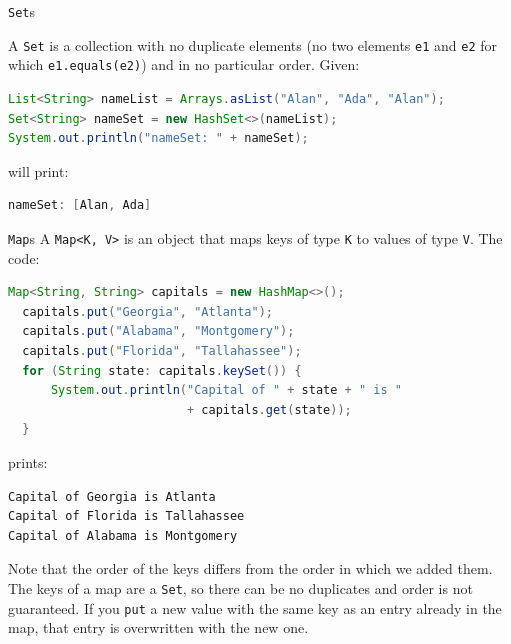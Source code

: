 \documentclass{beamer}
\begin{document}
\begin{frame}[fragile]{{\tt Set}s}

A {\tt Set} is a collection with no duplicate elements (no two elements {\tt e1} and {\tt e2} for which {\tt e1.equals(e2)}) and in no particular order.  Given:
\begin{lstlisting}[language=Java]
List<String> nameList = Arrays.asList("Alan", "Ada", "Alan");
Set<String> nameSet = new HashSet<>(nameList);
System.out.println("nameSet: " + nameSet);
\end{lstlisting}
will print:
\begin{lstlisting}[language=Java]
nameSet: [Alan, Ada]
\end{lstlisting}

\end{frame}

\begin{frame}[fragile]{{\tt Map}s}
\vspace{-.05in}
A {\tt Map<K, V>} is an object that maps keys of type {\tt K} to values of type {\tt V}.  The code:
\begin{lstlisting}[language=Java]
  Map<String, String> capitals = new HashMap<>();
  capitals.put("Georgia", "Atlanta");
  capitals.put("Alabama", "Montgomery");
  capitals.put("Florida", "Tallahassee");
  for (String state: capitals.keySet()) {
      System.out.println("Capital of " + state + " is "
                         + capitals.get(state));
  }
\end{lstlisting}
prints:
\vspace{-.05in}
\begin{lstlisting}[language=Java]
Capital of Georgia is Atlanta
Capital of Florida is Tallahassee
Capital of Alabama is Montgomery
\end{lstlisting}
\vspace{-.05in}
Note that the order of the keys differs from the order in which we added them.  The keys of a map are a {\tt Set}, so there can be no duplicates and order is not guaranteed.  If you {\tt put} a new value with the same key as an entry already in the map, that entry is overwritten with the new one.

\end{frame}
\end{document}

